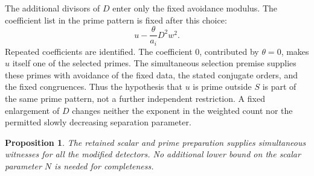 \documentclass[11pt,a4paper]{article}
\newtheorem{proposition}[theorem]{Proposition}
\theoremstyle{remark}\newtheorem{remark}[theorem]{Remark}
\begin{document}
The additional divisors of $D$ enter only the fixed avoidance modulus.
The coefficient list in the prime pattern is fixed after this choice:
\[
 u-\frac{\theta}{a_i}D^2w^2.
\]
Repeated coefficients are identified. The coefficient $0$, contributed
by $\theta=0$, makes $u$ itself one of the selected primes. The
simultaneous selection premise supplies these primes with avoidance of
the fixed data, the stated conjugate orders, and the fixed congruences.
Thus the hypothesis that $u$ is prime outside $S$ is part of the same
prime pattern, not a further independent restriction. A fixed enlargement
of $D$ changes neither the exponent in the weighted count nor the
permitted slowly decreasing separation parameter.

\begin{proposition}\label{prop:complete}
The retained scalar and prime preparation supplies simultaneous witnesses
for all the modified detectors. No additional lower bound on the scalar
parameter $N$ is needed for completeness.
\end{proposition}
\end{document}
